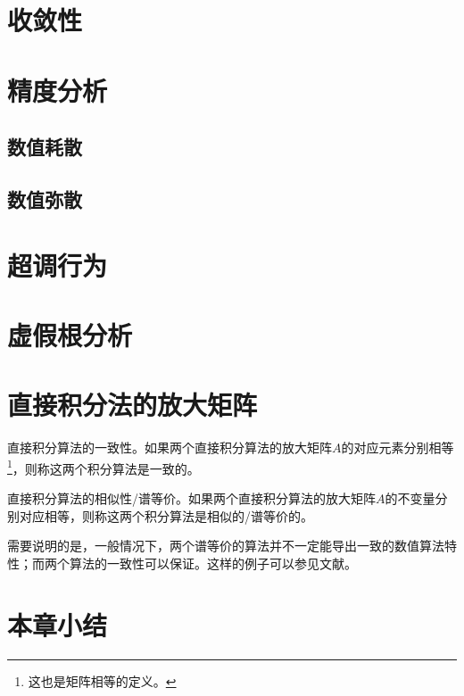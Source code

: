 \section{收敛性}

\section{精度分析}

\subsection{数值耗散}

\subsection{数值弥散}

\section{超调行为}

\section{虚假根分析}

\section{直接积分法的放大矩阵}

\begin{definition}
直接积分算法的一致性\cite{Hoff1988}。如果两个直接积分算法的放大矩阵$A$的对应元素分别相等\footnote{这也是矩阵相等的定义。}，则称这两个积分算法是一致的。
\end{definition}

\begin{definition}
直接积分算法的相似性/谱等价\cite{Hoff1988}。如果两个直接积分算法的放大矩阵$A$的不变量分别对应相等，则称这两个积分算法是相似的/谱等价的。
\end{definition}

需要说明的是，一般情况下，两个谱等价的算法并不一定能导出一致的数值算法特性；而两个算法的一致性可以保证。这样的例子可以参见文献。

\section{本章小结}



